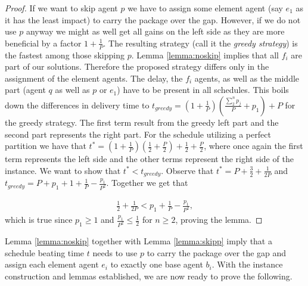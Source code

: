     \begin{proof}
     If we want to skip agent $p$ we have to assign some element agent (say $e_1$ as it has the least impact) to carry the package over the gap. However, if we do not use $p$ anyway we might as well get all gains on the left side as they are more beneficial by a factor $1+\frac{1}{P}$. The resulting strategy (call it the \emph{greedy strategy}) is the fastest among those skipping $p$. Lemma \ref{lemma:noskip} implies that all $f_i$ are part of our solutions. Therefore the proposed strategy differs only in the assignment of the element agents. The delay, the $f_i$ agents, as well as the middle part (agent $q$ as well as $p$ or $e_1$) have to be present in all schedules.
     This boils down the differences in delivery time to $t_{greedy}= (1+\frac{1}{P})(\frac{\sum_{2}^n p_j}{P}+p_1)+P$ for the greedy strategy. The first term result from the greedy left part and the second part represents the right part. For the schedule utilizing a perfect partition we have that $t^*=(1+\frac{1}{P})(\frac{1}{2}+\frac{P}{2})+ \frac{1}{2}+\frac{P}{2}$, where once again the first term represents the left side  and the other terms represent the right side of the instance. We want to show that $t^*<t_{greedy}$. Observe that $t^*=P + \frac{3}{2} + \frac{1}{2P}$ and $t_{greedy}= P + p_1 + 1 + \frac{1}{P} - \frac{p_1}{P^2}$. Together we get that

     \begin{align*}
        \frac{1}{2} + \frac{1}{2P} < p_1 + \frac{1}{P} - \frac{p_1}{P^2},
     \end{align*}
     which is true since $p_1\geq 1$ and $\frac{p_1}{P^2} \leq \frac{1}{2}$ for $n\geq 2$, proving the lemma.      
    \end{proof}

    Lemma \ref{lemma:noskip} together with Lemma \ref{lemma:skipp} imply that a schedule beating time $t$ needs to use $p$ to carry the package over the gap and assign each element agent $e_i$ to exactly one base agent $b_i$. With the instance construction and lemmas established, we are now ready to prove the following. 

\thmline* 

